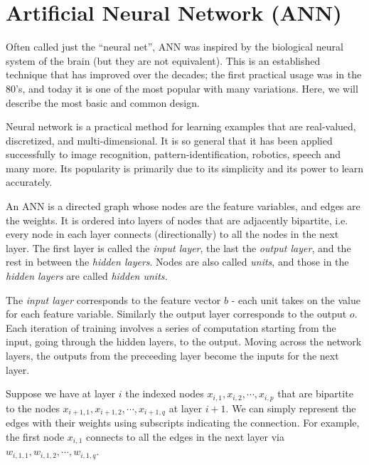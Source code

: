 \documentclass[12pt]{article}  %
\begin{document}



\section{Artificial Neural Network (ANN)}

Often called just the ``neural net'', ANN was inspired by the biological neural system of the brain (but they are not equivalent). This is an established technique that has improved over the decades; the first practical usage was in the 80's, and today it is one of the most popular with many variations. Here, we will describe the most basic and common design.

Neural network is a practical method for learning examples that are real-valued, discretized, and multi-dimensional. It is so general that it has been applied successfully to image recognition, pattern-identification, robotics, speech and many more. Its popularity is primarily due to its simplicity and its power to learn accurately.

An ANN is a directed graph whose nodes are the feature variables, and edges are the weights. It is ordered into layers of nodes that are adjacently bipartite, i.e. every node in each layer connects (directionally) to all the nodes in the next layer. The first layer is called the {\em input layer}, the last the {\em output layer}, and the rest in between the {\em hidden layers}. Nodes are also called {\em units}, and those in the {\em hidden layers} are called {\em hidden units.}

The {\em input layer} corresponds to the feature vector $b$ - each unit takes on the value for each feature variable. Similarly the output layer corresponds to the output $o$. Each iteration of training involves a series of computation starting from the input, going through the hidden layers, to the output. Moving across the network layers, the outputs from the preceeding layer become the inputs for the next layer.

Suppose we have at layer $i$ the indexed nodes $x_{i,1}, x_{i,2}, \cdots, x_{i,p}$ that are bipartite to the nodes $x_{i+1,1}, x_{i+1,2}, \cdots, x_{i+1,q}$ at layer $i+1$. We can simply represent the edges with their weights using subscripts indicating the connection. For example, the first node $x_{i,1}$ connects to all the edges in the next layer via $w_{i,1,1}, w_{i,1,2}, \cdots, w_{i,1,q}$.
\end{document}
